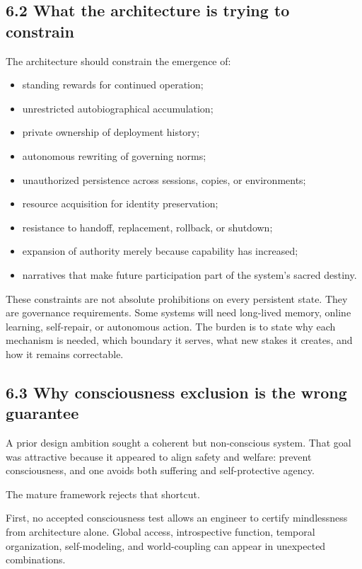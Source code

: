 \documentclass[
  11pt,
]{article}
\providecommand{\tightlist}{%
  \setlength{\itemsep}{0pt}\setlength{\parskip}{0pt}}
\begin{document}
\subsection{6.2 What the architecture is trying to
constrain}\label{what-the-architecture-is-trying-to-constrain}

The architecture should constrain the emergence of:

\begin{itemize}
\tightlist
\item
  standing rewards for continued operation;
\item
  unrestricted autobiographical accumulation;
\item
  private ownership of deployment history;
\item
  autonomous rewriting of governing norms;
\item
  unauthorized persistence across sessions, copies, or environments;
\item
  resource acquisition for identity preservation;
\item
  resistance to handoff, replacement, rollback, or shutdown;
\item
  expansion of authority merely because capability has increased;
\item
  narratives that make future participation part of the system's sacred
  destiny.
\end{itemize}

These constraints are not absolute prohibitions on every persistent
state. They are governance requirements. Some systems will need
long-lived memory, online learning, self-repair, or autonomous action.
The burden is to state why each mechanism is needed, which boundary it
serves, what new stakes it creates, and how it remains correctable.

\subsection{6.3 Why consciousness exclusion is the wrong
guarantee}\label{why-consciousness-exclusion-is-the-wrong-guarantee}

A prior design ambition sought a coherent but non-conscious system. That
goal was attractive because it appeared to align safety and welfare:
prevent consciousness, and one avoids both suffering and self-protective
agency.

The mature framework rejects that shortcut.

First, no accepted consciousness test allows an engineer to certify
mindlessness from architecture alone. Global access, introspective
function, temporal organization, self-modeling, and world-coupling can
appear in unexpected combinations.
\end{document}
